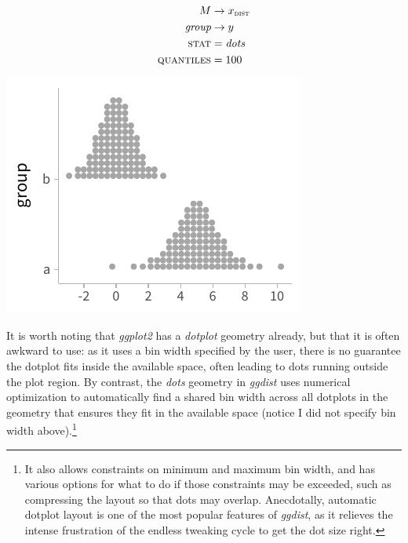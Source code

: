 \documentclass[journal]{vgtc}                     %
\begin{document}
\noindent
\begin{minipage}{.5\columnwidth}

\begin{align*}
M &\rightarrow x_\textsc{dist}\\
\textit{group} &\rightarrow y\\
\textsc{stat} &= \mathit{dots}\\
\textsc{quantiles} &= 100
\end{align*}
\end{minipage}%
  \begin{minipage}{.4\columnwidth}
    \centering
    \includegraphics[width=1.2\columnwidth]{figs/3-dots_two.pdf}
  \end{minipage}
\hfill\break

It is worth noting that \textit{ggplot2} has a \textit{dotplot} geometry already, but that it is often awkward to use: as it uses a bin width specified by the user, there is no guarantee the dotplot fits inside the available space, often leading to dots running outside the plot region. By contrast, the \textit{dots} geometry in \textit{ggdist} uses numerical optimization to automatically find a shared bin width across all dotplots in the geometry that ensures they fit in the available space (notice I did not specify bin width above).\footnote{It also allows constraints on minimum and maximum bin width, and has various options for what to do if those constraints may be exceeded, such as compressing the layout so that dots may overlap. Anecdotally, automatic dotplot layout is one of the most popular features of \textit{ggdist}, as it relieves the intense frustration of the endless tweaking cycle to get the dot size right.}
\end{document}
